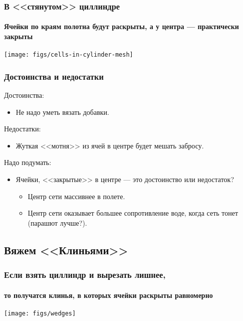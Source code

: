 \begin{frame}
    \frametitle{В <<стянутом>> циллиндре}
    \framesubtitle{Ячейки по краям полотна будут раскрыты, а у центра --- практически закрыты}

    \begin{center}
        \texttt{[image: figs/cells-in-cylinder-mesh]}
    \end{center}
\end{frame}

\begin{frame}
    \frametitle{Достоинства и недостатки}
	
	Достоинства:
    \begin{itemize}
        \item Не надо уметь вязать добавки.
    \end{itemize}
	
	Недостатки:
    \begin{itemize}
        \item Жуткая <<мотня>> из ячей в центре будет мешать забросу.
    \end{itemize}
	
	Надо подумать:
    \begin{itemize}
        \item Ячейки, <<закрытые>> в центре --- это достоинство или недостаток?
		\begin{itemize}
			\item Центр сети массивнее в полете.
			\item Центр сети оказывает большее сопротивление воде, когда сеть тонет (парашют лучше?).
		\end{itemize}		
    \end{itemize}
\end{frame}


\subsection{Вяжем <<Клиньями>>}

\begin{frame}
    \frametitle{Если взять циллиндр и вырезать лишнее,}
    \framesubtitle{то получатся клинья, в которых ячейки раскрыты равномерно}

    \begin{center}
        \texttt{[image: figs/wedges]}
    \end{center}
\end{frame}

